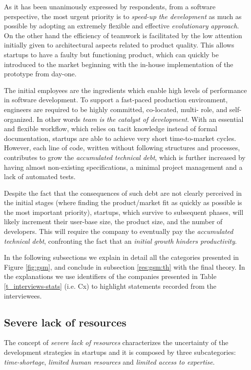 \documentclass[10pt,journal,letterpaper,compsoc]{IEEEtran}
\begin{document}
As it has been unanimously expressed by respondents, from a software
perspective, the most urgent priority is to \textit{speed-up the development} as
much as possible by adopting an extremely flexible and effective
\textit{evolutionary approach}. On the other hand the efficiency of teamwork is
facilitated by the low attention initially given to architectural aspects
related to product quality. This allows startups to have a faulty but
functioning product, which can quickly be introduced to the market beginning
with the in-house implementation of the prototype from day-one.

The initial employees are the ingredients which enable high levels of
performance in software development. To support a fast-paced production
environment, engineers are required to be highly committed, co-located,  multi-
role, and self-organized. In other words \textit{team is the catalyst of
development}. With an essential and flexible workflow, which relies on tacit
knowledge  instead of formal documentation, startups are able to achieve very
short  time-to-market cycles. However, each line of code, written without
following  structures and processes, contributes to grow the \textit{accumulated
technical  debt}, which is further increased by having almost non-existing
specifications,  a minimal project management and a lack of automated tests.

Despite the fact that the consequences of such debt are not clearly perceived
in the initial stages (where finding the product/market fit as quickly as
possible is the most important priority), startups, which survive to subsequent
phases, will likely increment their user-base size, the product size, and the
number of developers. This will require the company to eventually pay the
\textit{accumulated technical debt}, confronting the fact that an
\textit{initial growth hinders productivity}.

In the following subsections we explain in detail all the categories presented
in Figure \ref{fig:gsm}, and conclude in subsection \ref{res:gsm:th} with the
final theory. In the explanations we use identifiers of the companies presented
in Table \ref{t_interviews-stats} (i.e. Cx) to highlight statements recorded
from the interviewees.

\subsection{Severe lack of resources}\label{res:gsm:cat7} 
The concept of \textit{severe lack of resources} characterizes the uncertainty  
of the development strategies in startups and it is composed by 
three subcategories: \textit{time-shortage}, \textit{limited human resources} 
and \textit{limited access to expertise}.
\end{document}
